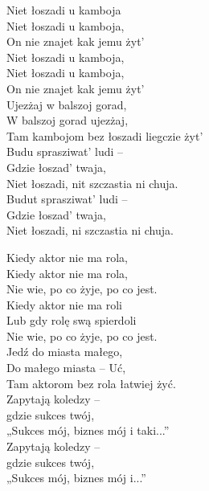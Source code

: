 \begin{text}
    Niet łoszadi u kamboja\\
    Niet łoszadi u kamboja, \\
    On nie znajet kak jemu żyt’ \\
    Niet łoszadi u kamboja,\\
    Niet łoszadi u kamboja,\\
    On nie znajet kak jemu żyt’\\
    Ujezżaj w balszoj gorad,\\ 
    W balszoj gorad ujezżaj,\\
    Tam kambojom bez łoszadi liegczie żyt’\\
    Budu sprasziwat’ ludi –\\
    Gdzie łoszad’ twaja,\\
    Niet łoszadi, nit szczastia ni chuja.\\
    Budut sprasziwat’ ludi –\\
    Gdzie łoszad’ twaja,\\
    Niet łoszadi, ni szczastia ni chuja. 

    Kiedy aktor nie ma rola,\\
    Kiedy aktor nie ma rola,\\
    Nie wie, po co żyje, po co jest.\\
    Kiedy aktor nie ma roli\\
    Lub gdy rolę swą spierdoli \\
    Nie wie, po co żyje, po co jest.\\
    Jedź do miasta małego, \\
    Do małego miasta – Uć, \\
    Tam aktorom bez rola łatwiej żyć.\\ 
    Zapytają koledzy –\\
    gdzie sukces twój,\\
    „Sukces mój, biznes mój i taki...”\\ 
    Zapytają koledzy –\\
    gdzie sukces twój, \\
    „Sukces mój, biznes mój i...” 	

\end{text}
